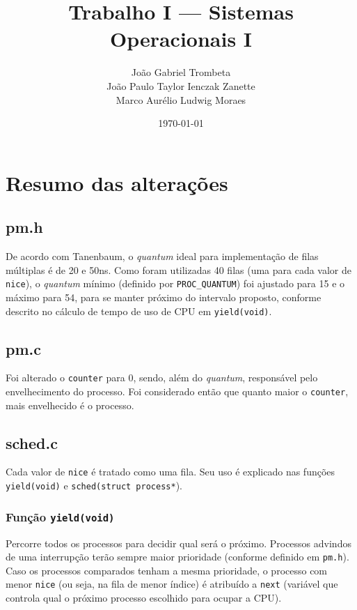 \documentclass{article}
\title{Trabalho I --- Sistemas Operacionais I}
\author{João Gabriel Trombeta\\
        João Paulo Taylor Ienczak Zanette\\
        Marco Aurélio Ludwig Moraes}
\date{\today}
\begin{document}
\maketitle

\section{Resumo das alterações}

\subsection{pm.h}

De acordo com Tanenbaum, o \textit{quantum} ideal para implementação de filas
múltiplas é de 20 e 50ns. Como foram utilizadas 40 filas (uma para cada valor
de \texttt{nice}), o \textit{quantum} mínimo (definido por
\texttt{PROC\_QUANTUM}) foi ajustado para 15 e o máximo para 54, para se manter
próximo do intervalo proposto, conforme descrito no cálculo de tempo de uso de
CPU em \texttt{yield(void)}.

\subsection{pm.c}

Foi alterado o \texttt{counter} para 0, sendo, além do \textit{quantum},
responsável pelo envelhecimento do processo. Foi considerado então que quanto
maior o \texttt{counter}, mais envelhecido é o processo.

\subsection{sched.c}

Cada valor de \texttt{nice} é tratado como uma fila. Seu uso é explicado nas
funções \texttt{yield(void)} e \texttt{sched(struct process*}).

\subsubsection{Função \texttt{yield(void)}}

Percorre todos os processos para decidir qual será o próximo. Processos
advindos de uma interrupção terão sempre maior prioridade (conforme definido em
\texttt{pm.h}). Caso os processos comparados tenham a mesma prioridade, o
processo com menor \texttt{nice} (ou seja, na fila de menor índice) é atribuído
a \texttt{next} (variável que controla qual o próximo processo escolhido para
ocupar a CPU).
\end{document}
